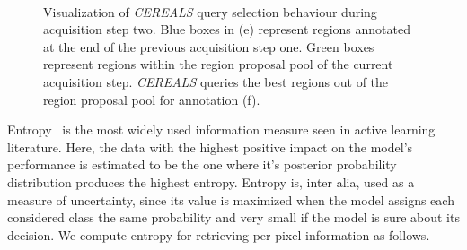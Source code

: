 \documentclass{bmvc2k}
\begin{document}
\begin{figure}[!ht]
\begin{subfigure}[Est. Semantic Segmentation]{\texttt{[image: figures/method/round\_2/general/overlayed\_output]}\label{fig:method:semseg}}\end{subfigure}
\begin{subfigure}[Information Map]{\texttt{[image: figures/method/round\_2/informativeness/aachen\_000017\_000019\_informativeness]}\label{fig:method:information_map}}\end{subfigure}
\begin{subfigure}[Est. Cost Map]{\texttt{[image: figures/method/round\_2/costs/aachen\_000017\_000019\_costs]}\label{fig:method:cost_map}}\end{subfigure}\\

\begin{subfigure}[Fused Region Map]{\texttt{[image: figures/method/round\_2/costs/aachen\_000017\_000019\_information\_cost\_tradeoff\_16x16]}\label{fig:method:fused}}\end{subfigure}
\begin{subfigure}[Region Proposals]{\texttt{[image: figures/method/round\_2/region\_extraction/aachen\_000017\_000019\_highest\_informative\_region\_coordinates\_output\_2\_]}\label{fig:method:region_proposals}}\end{subfigure}
\begin{subfigure}[Annotated Regions]{\texttt{[image: figures/method/round\_2/preprocessing/aachen\_000017\_000019]}\label{fig:method:annotation}}\end{subfigure}

\caption{Visualization of \textit{CEREALS} query selection behaviour during acquisition step two. Blue boxes in (e) represent regions annotated at the end of the previous acquisition step one. Green boxes represent regions within the region proposal pool of the current acquisition step. \textit{CEREALS} queries the best regions out of the region proposal pool for annotation (f).}
\vspace{-0.25cm}
\end{figure}

Entropy~\cite{DBLP:journals/sigmobile/Shannon01} is the most widely used information measure seen in active learning literature. Here, the data with the highest positive impact on the model's performance is estimated to be the one where it's posterior probability distribution produces the highest entropy. Entropy is, inter alia, used as a measure of uncertainty, since its value is maximized when the model assigns each considered class the same probability and very small if the model is sure about its decision. We compute entropy for retrieving per-pixel information as follows.
\end{document}
